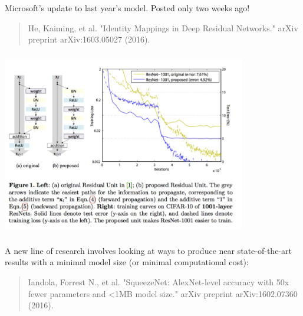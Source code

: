 \documentclass[xetex,mathserif,serif,aspectratio=169]{beamer}
\begin{document}
\begin{frame}[fragile] \frametitle{} \oldB \small


Microsoft's update to last year's model. Posted only two
weeks ago!
\begin{quote}
He, Kaiming, et al. "Identity Mappings in Deep Residual Networks." arXiv preprint arXiv:1603.05027 (2016).
\end{quote}

\end{frame}

\begin{frame}[fragile] \frametitle{} \oldB \small

\begin{center}
\includegraphics[width=0.8\textwidth]{img/resNet1001.jpg}
\end{center}

\end{frame}

\begin{frame}[fragile] \frametitle{} \oldB \small


A new line of research involves looking at ways to produce near
state-of-the-art results with a minimal model size (or minimal
computational cost):
\begin{quote}
Iandola, Forrest N., et al. "SqueezeNet: AlexNet-level accuracy with
50x fewer parameters and <1MB model size." arXiv preprint arXiv:1602.07360 (2016).
\end{quote}

\end{frame}
\end{document}
